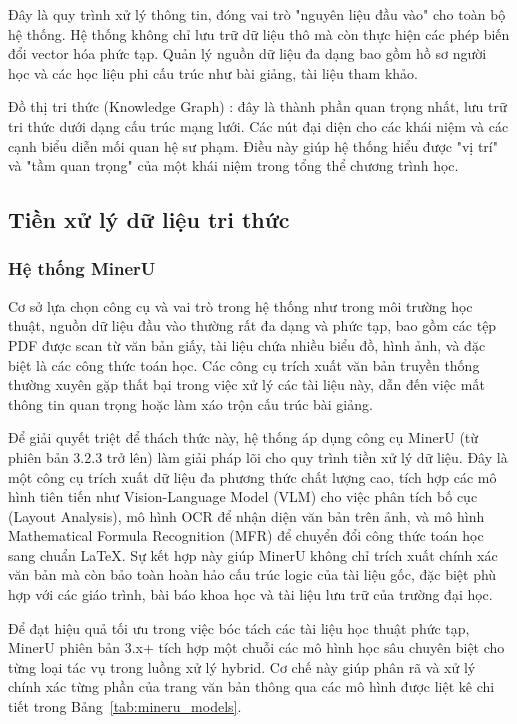 \indent Đây là quy trình xử lý thông tin, đóng vai trò "nguyên liệu đầu vào" cho toàn bộ hệ thống. Hệ thống không chỉ lưu trữ dữ liệu thô mà còn thực hiện các phép biến đổi vector hóa phức tạp. Quản lý nguồn dữ liệu đa dạng bao gồm hồ sơ người học và các học liệu phi cấu trúc như bài giảng, tài liệu tham khảo.

\indent Đồ thị tri thức (Knowledge Graph) \cite{knowledge_graphs}: đây là thành phần quan trọng nhất, lưu trữ tri thức dưới dạng cấu trúc mạng lưới. Các nút đại diện cho các khái niệm và các cạnh biểu diễn mối quan hệ sư phạm. Điều này giúp hệ thống hiểu được "vị trí" và "tầm quan trọng" của một khái niệm trong tổng thể chương trình học.

\subsection{Tiền xử lý dữ liệu tri thức}

\subsubsection{Hệ thống MinerU}
Cơ sở lựa chọn công cụ và vai trò trong hệ thống như trong môi trường học thuật, nguồn dữ liệu đầu vào thường rất đa dạng và phức tạp, bao gồm các tệp PDF được scan từ văn bản giấy, tài liệu chứa nhiều biểu đồ, hình ảnh, và đặc biệt là các công thức toán học. Các công cụ trích xuất văn bản truyền thống thường xuyên gặp thất bại trong việc xử lý các tài liệu này, dẫn đến việc mất thông tin quan trọng hoặc làm xáo trộn cấu trúc bài giảng.

\indent Để giải quyết triệt để thách thức này, hệ thống áp dụng công cụ MinerU \cite{mineru_2024} (từ phiên bản 3.2.3 trở lên) làm giải pháp lõi cho quy trình tiền xử lý dữ liệu. Đây là một công cụ trích xuất dữ liệu đa phương thức chất lượng cao, tích hợp các mô hình tiên tiến như Vision-Language Model (VLM) cho việc phân tích bố cục (Layout Analysis), mô hình OCR để nhận diện văn bản trên ảnh, và mô hình Mathematical Formula Recognition (MFR) để chuyển đổi công thức toán học sang chuẩn LaTeX. Sự kết hợp này giúp MinerU không chỉ trích xuất chính xác văn bản mà còn bảo toàn hoàn hảo cấu trúc logic của tài liệu gốc, đặc biệt phù hợp với các giáo trình, bài báo khoa học và tài liệu lưu trữ của trường đại học.

\indent Để đạt hiệu quả tối ưu trong việc bóc tách các tài liệu học thuật phức tạp, MinerU phiên bản 3.x+ tích hợp một chuỗi các mô hình học sâu chuyên biệt cho từng loại tác vụ trong luồng xử lý hybrid. Cơ chế này giúp phân rã và xử lý chính xác từng phần của trang văn bản thông qua các mô hình được liệt kê chi tiết trong Bảng~\ref{tab:mineru_models}.

